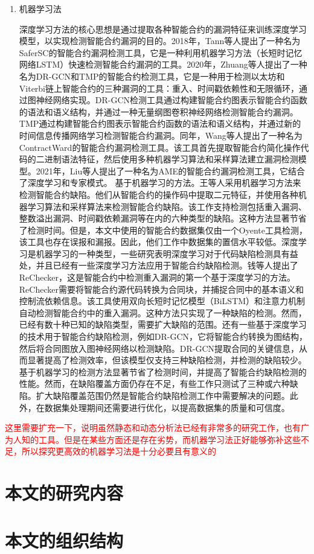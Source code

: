 \begin{enumerate}[label=\textbf{\textit{\Alph*.}}, align=left]
    \item 机器学习法
    
    深度学习方法的核心思想是通过提取各种智能合约的漏洞特征来训练深度学习模型，以实现检测智能合约漏洞的目的。2018年，Tann等人提出了一种名为SaferSC的智能合约漏洞检测工具，它是一种利用机器学习方法（长短时记忆网络LSTM）快速检测智能合约漏洞的工具。2020年，Zhuang等人提出了一种名为DR-GCN和TMP的智能合约检测工具，它是一种用于检测以太坊和Viterbi链上智能合约的三种漏洞的工具：重入、时间戳依赖性和无限循环，通过图神经网络实现。DR-GCN检测工具通过构建智能合约图表示智能合约函数的语法和语义结构，并通过一种无量纲图卷积神经网络检测智能合约漏洞。TMP通过构建智能合约图表示智能合约函数的语法和语义结构，并通过新的时间信息传播网络学习检测智能合约漏洞。同年，Wang等人提出了一种名为ContractWard的智能合约漏洞检测工具。该工具首先提取智能合约简化操作代码的二进制语法特征，然后使用多种机器学习算法和采样算法建立漏洞检测模型。2021年，Liu等人提出了一种名为AME的智能合约漏洞检测工具，它结合了深度学习和专家模式。
    基于机器学习的方法。王等人采用机器学习方法来检测智能合约缺陷。他们从智能合约的操作码中提取二元特征，并使用各种机器学习算法和采样算法来检测智能合约缺陷。该工作支持检测包括重入漏洞、整数溢出漏洞、时间戳依赖漏洞等在内的六种类型的缺陷。这种方法显著节省了检测时间。但是，本文中使用的智能合约数据集仅由一个Oyente工具检测，该工具也存在误报和漏报。因此，他们工作中数据集的置信水平较低。深度学习是机器学习的一种类型，一些研究表明深度学习对于代码缺陷检测具有益处，并且已经有一些深度学习方法应用于智能合约缺陷检测。钱等人提出了ReChecker，这是智能合约中检测重入漏洞的第一个基于深度学习的方法。ReChecker需要将智能合约源代码转换为合同块，并捕捉合同中的基本语义和控制流依赖信息。该工具使用双向长短时记忆模型（BiLSTM）和注意力机制自动检测智能合约中的重入漏洞。这种方法只实现了一种缺陷的检测。然而，已经有数十种已知的缺陷类型，需要扩大缺陷的范围。还有一些基于深度学习的技术用于智能合约缺陷检测，例如DR-GCN，它将智能合约转换为图结构，然后将合同图放入图神经网络以检测缺陷。DR-GCN提取合同的关键信息，从而显著提高了检测效率，但该模型仅支持三种缺陷检测，并检测的缺陷较少。基于机器学习的检测方法显著节省了检测时间，并提高了智能合约缺陷检测的性能。然而，在缺陷覆盖方面仍存在不足，有些工作只测试了三种或六种缺陷。扩大缺陷覆盖范围仍然是智能合约缺陷检测工作中需要解决的问题。此外，在数据集处理期间还需要进行优化，以提高数据集的质量和可信度。
\end{enumerate}
\textcolor{red}{这里需要扩充一下，说明虽然静态和动态分析法已经有非常多的研究工作，也有广为人知的工具。但是在某些方面还是存在劣势，而机器学习法正好能够弥补这些不足，所以探究更高效的机器学习法是十分必要且有意义的}

\section{本文的研究内容}

\section{本文的组织结构}